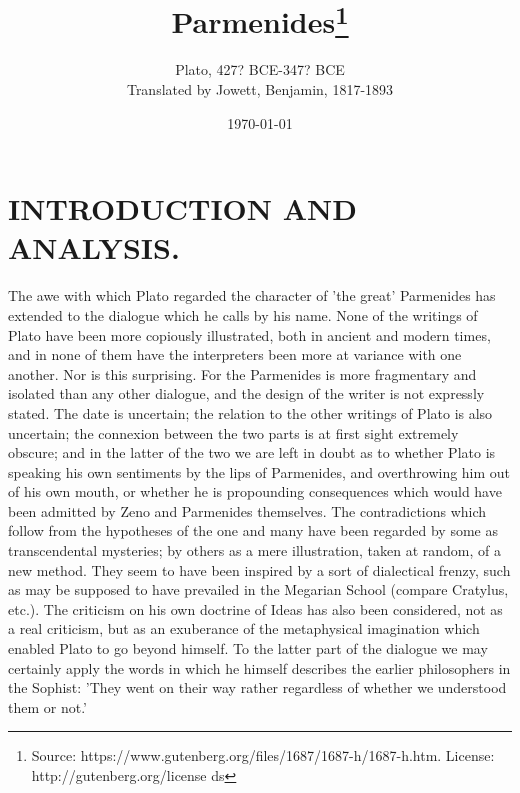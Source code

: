 \documentclass[11pt,letter]{article}
\begin{document}
\title{Parmenides\thanks{Source: https://www.gutenberg.org/files/1687/1687-h/1687-h.htm. License: http://gutenberg.org/license ds}}
\date{\today}
\author{Plato, 427? BCE-347? BCE\\ Translated by Jowett, Benjamin, 1817-1893}
\maketitle

\setcounter{tocdepth}{1}
\tableofcontents
\renewcommand{\baselinestretch}{1.0}
\normalsize
\newpage

\section{
      INTRODUCTION AND ANALYSIS.
    }
\par  The awe with which Plato regarded the character of 'the great' Parmenides has extended to the dialogue which he calls by his name. None of the writings of Plato have been more copiously illustrated, both in ancient and modern times, and in none of them have the interpreters been more at variance with one another. Nor is this surprising. For the Parmenides is more fragmentary and isolated than any other dialogue, and the design of the writer is not expressly stated. The date is uncertain; the relation to the other writings of Plato is also uncertain; the connexion between the two parts is at first sight extremely obscure; and in the latter of the two we are left in doubt as to whether Plato is speaking his own sentiments by the lips of Parmenides, and overthrowing him out of his own mouth, or whether he is propounding consequences which would have been admitted by Zeno and Parmenides themselves. The contradictions which follow from the hypotheses of the one and many have been regarded by some as transcendental mysteries; by others as a mere illustration, taken at random, of a new method. They seem to have been inspired by a sort of dialectical frenzy, such as may be supposed to have prevailed in the Megarian School (compare Cratylus, etc.). The criticism on his own doctrine of Ideas has also been considered, not as a real criticism, but as an exuberance of the metaphysical imagination which enabled Plato to go beyond himself. To the latter part of the dialogue we may certainly apply the words in which he himself describes the earlier philosophers in the Sophist: 'They went on their way rather regardless of whether we understood them or not.'
\end{document}

